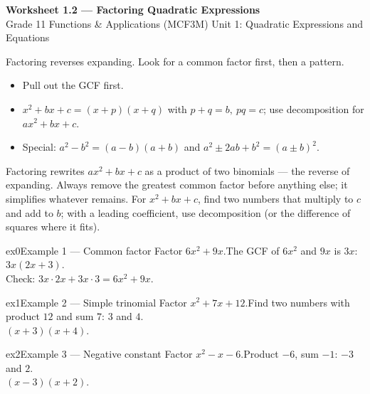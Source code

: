 \documentclass[11pt]{article}
\begin{document}
\begin{center}
{\LARGE\bfseries\color{titleblue}Worksheet 1.2 --- Factoring Quadratic Expressions}\\[2pt]
{\small Grade 11 Functions \& Applications (MCF3M) \textperiodcentered{} Unit 1: Quadratic Expressions and Equations}
\end{center}

\begin{ideabox}
Factoring reverses expanding. Look for a common factor first, then a pattern.
\begin{itemize}[leftmargin=*,itemsep=2pt]
  \item Pull out the GCF first.
  \item $x^2+bx+c=(x+p)(x+q)$ with $p+q=b,\ pq=c$; use decomposition for $ax^2+bx+c$.
  \item Special: $a^2-b^2=(a-b)(a+b)$ and $a^2\pm2ab+b^2=(a\pm b)^2$.
\end{itemize}
\end{ideabox}

\begin{learnbox}
Factoring rewrites $ax^2+bx+c$ as a product of two binomials — the reverse of expanding.
Always remove the greatest common factor before anything else; it simplifies whatever remains.
For $x^2+bx+c$, find two numbers that multiply to $c$ and add to $b$; with a leading coefficient, use decomposition (or the difference of squares where it fits).
\end{learnbox}


\begin{example}{ex0}{Example 1 --- Common factor}
Factor $6x^2+9x$.\soln The GCF of $6x^2$ and $9x$ is $3x$: \\ $3x(2x+3)$. \\ Check: $3x\cdot2x+3x\cdot3=6x^2+9x$. \checkmark
\end{example}

\begin{example}{ex1}{Example 2 --- Simple trinomial}
Factor $x^2+7x+12$.\soln Find two numbers with product $12$ and sum $7$: $3$ and $4$. \\ $(x+3)(x+4)$.
\end{example}

\begin{example}{ex2}{Example 3 --- Negative constant}
Factor $x^2-x-6$.\soln Product $-6$, sum $-1$: $-3$ and $2$. \\ $(x-3)(x+2)$.
\end{example}
\end{document}
